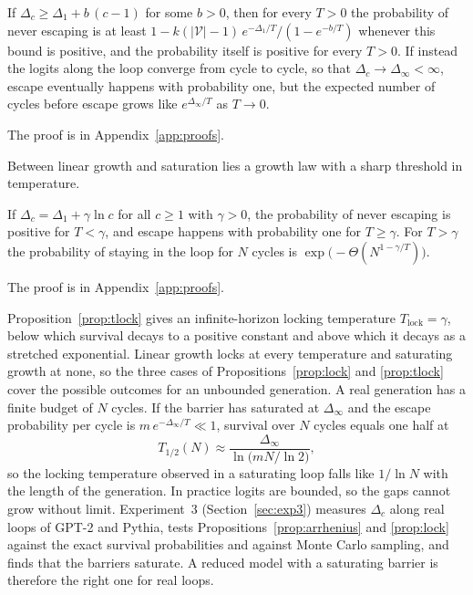 \begin{proposition}
\label{prop:lock}
If $\Delta_c\ge\Delta_1+b\,(c-1)$ for some $b>0$, then for every $T>0$ the probability of never escaping is at least $1-k(|\mathcal V|-1)\,e^{-\Delta_1/T}/(1-e^{-b/T})$ whenever this bound is positive, and the probability itself is positive for every $T>0$. If instead the logits along the loop converge from cycle to cycle, so that $\Delta_c\to\Delta_\infty<\infty$, escape eventually happens with probability one, but the expected number of cycles before escape grows like $e^{\Delta_\infty/T}$ as $T\to0$.
\end{proposition}
\noindent The proof is in Appendix~\ref{app:proofs}.

Between linear growth and saturation lies a growth law with a sharp threshold in temperature.

\begin{proposition}
\label{prop:tlock}
If $\Delta_c=\Delta_1+\gamma\ln c$ for all $c\ge1$ with $\gamma>0$, the probability of never escaping is positive for $T<\gamma$, and escape happens with probability one for $T\ge\gamma$. For $T>\gamma$ the probability of staying in the loop for $N$ cycles is $\exp\!\big(-\Theta(N^{1-\gamma/T})\big)$.
\end{proposition}
\noindent The proof is in Appendix~\ref{app:proofs}.

Proposition~\ref{prop:tlock} gives an infinite-horizon locking temperature $T_{\mathrm{lock}}=\gamma$, below which survival decays to a positive constant and above which it decays as a stretched exponential. Linear growth locks at every temperature and saturating growth at none, so the three cases of Propositions~\ref{prop:lock} and \ref{prop:tlock} cover the possible outcomes for an unbounded generation. A real generation has a finite budget of $N$ cycles. If the barrier has saturated at $\Delta_\infty$ and the escape probability per cycle is $m\,e^{-\Delta_\infty/T}\ll1$, survival over $N$ cycles equals one half at
\begin{equation}
T_{1/2}(N)\approx\frac{\Delta_\infty}{\ln\!\big(mN/\ln2\big)},
\label{eq:thalf}
\end{equation}
so the locking temperature observed in a saturating loop falls like $1/\ln N$ with the length of the generation. In practice logits are bounded, so the gaps cannot grow without limit. Experiment~3 (Section~\ref{sec:exp3}) measures $\Delta_c$ along real loops of GPT-2 and Pythia, tests Propositions~\ref{prop:arrhenius} and \ref{prop:lock} against the exact survival probabilities and against Monte Carlo sampling, and finds that the barriers saturate. A reduced model with a saturating barrier is therefore the right one for real loops.

